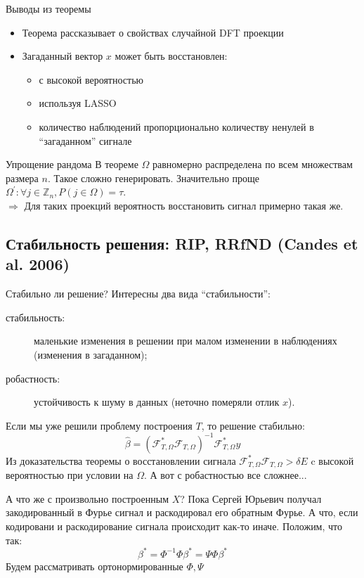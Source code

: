 \documentclass[14pt, fleqn, xcolor={dvipsnames, table}]{beamer}
\begin{document}
\begin{frame}{Выводы из теоремы}
\begin{itemize}
  \item Теорема рассказывает о свойствах случайной DFT проекции
  \item Загаданный вектор $x$ может быть восстановлен:
  \begin{itemize}
    \item с высокой вероятностью
    \item используя LASSO
    \item количество наблюдений пропорционально количеству ненулей в ``загаданном'' сигнале
  \end{itemize}
\end{itemize}
\end{frame}

\begin{frame}{Упрощение рандома}
В теореме $\Omega$ равномерно распределена по всем множествам размера $n$. Такое сложно генерировать. Значительно проще $\Omega^{'}: \forall j \in \mathbb{Z}_n, P(j \in \Omega) = \tau$. \\
$\Rightarrow$ Для таких проекций вероятность восстановить сигнал примерно такая же.
\end{frame}

\subsection{Стабильность решения: RIP, RRfND (Candes et al. 2006)}
\begin{frame}{Стабильно ли решение?}
\small
Интересны два вида ``стабильности'':
\begin{description}
  \item[стабильность:] маленькие изменения в решении при малом изменении в наблюдениях (изменения в загаданном);
  \item[робастность:] устойчивость к шуму в данных (неточно померяли отлик $x$).
\end{description}
Если мы уже решили проблему построения $T$, то решение стабильно:
$$
\hat{\beta} = (\mathcal{F}^*_{T,\Omega}\mathcal{F}_{T,\Omega})^{-1}\mathcal{F}^*_{T,\Omega}y
$$
Из доказательства теоремы о восстановлении сигнала $\mathcal{F}^*_{T,\Omega}\mathcal{F}_{T,\Omega} > \delta E$ c высокой вероятностью при условии на $\Omega$. А вот с робастностью все сложнее...
\end{frame}

\begin{frame}{А что же с произвольно построенным $X$?}
Пока Сергей Юрьевич получал закодированный в Фурье сигнал и раскодировал его обратным Фурье. А что, если кодировани и раскодирование сигнала происходит как-то иначе. Положим, что так:
$$
\beta^* = \Phi^{-1} \Phi \beta^* = \Psi \Phi \beta^*
$$
Будем рассматривать ортонормированные $\Phi, \Psi$
\end{frame}
\end{document}
